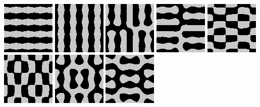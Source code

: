 \includegraphics{o/chladni_057.png}
\includegraphics{o/chladni_058.png}
\includegraphics{o/chladni_059.png}
\includegraphics{o/chladni_060.png}
\includegraphics{o/chladni_061.png}
\includegraphics{o/chladni_062.png}
\includegraphics{o/chladni_063.png}
\includegraphics{o/chladni_064.png}



